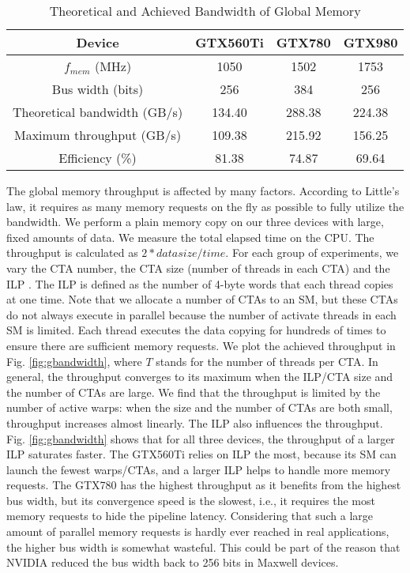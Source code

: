 \documentclass[10pt,journal,compsoc]{IEEEtran}
\theoremstyle{definition}
\begin{document}
\begin{table}
\renewcommand{\arraystretch}{1.1}
\centering
\caption{Theoretical and Achieved Bandwidth of Global Memory}
\label{tab:bandwidth}
\begin{tabular}{|c|c|c|c|}
  \hline
Device & GTX560Ti&GTX780&GTX980 \\ \hline
  $f_{mem}$ (MHz) &1050&1502&1753 \\ \hline
  Bus width (bits) & 256 &384 & 256 \\ \hline
  Theoretical bandwidth (GB/s) & 134.40 & 288.38 & 224.38 \\ \hline
  Maximum throughput (GB/s) & 109.38 & 215.92 & 156.25 \\ \hline
  Efficiency (\%) & 81.38 & 74.87 & 69.64 \\
  \hline
\end{tabular}
\end{table}



The global memory throughput is affected by many factors. According to Little's law, it requires as many memory requests on the fly as possible to fully utilize the bandwidth. We perform a plain memory copy on our three devices with large, fixed amounts of data. We measure the total elapsed time on the CPU. The throughput is calculated as $2 * data size / time$. For each group of experiments, we vary the CTA number, the CTA size (number of threads in each CTA) and the ILP \cite{volkov2010better}. The ILP is defined as the number of 4-byte words that each thread copies at one time. Note that we allocate a number of CTAs to an SM, but these CTAs do not always execute in parallel because the number of activate threads in each SM is limited. Each thread executes the data copying for hundreds of times to ensure there are sufficient memory requests. We plot the achieved throughput in Fig. \ref{fig:gbandwidth}, where $T$ stands for the number of threads per CTA. In general, the throughput converges to its maximum when the ILP/CTA size and the number of CTAs are large. We find that the throughput is limited by the number of active warps: when the size and the number of CTAs are both small, throughput increases almost linearly. The ILP also influences the throughput. Fig. \ref{fig:gbandwidth} shows that for all three devices, the throughput of a larger ILP saturates faster. The GTX560Ti relies on ILP the most, because its SM can launch the fewest warps/CTAs, and a larger ILP helps to handle more memory requests. The GTX780 has the highest throughput as it benefits from the highest bus width, but its convergence speed is the slowest, i.e., it requires the most memory requests to hide the pipeline latency. Considering that such a large amount of parallel memory requests is hardly ever reached in real applications, the higher bus width is somewhat wasteful. This could be part of the reason that NVIDIA reduced the bus width back to 256 bits in Maxwell devices.
\end{document}
